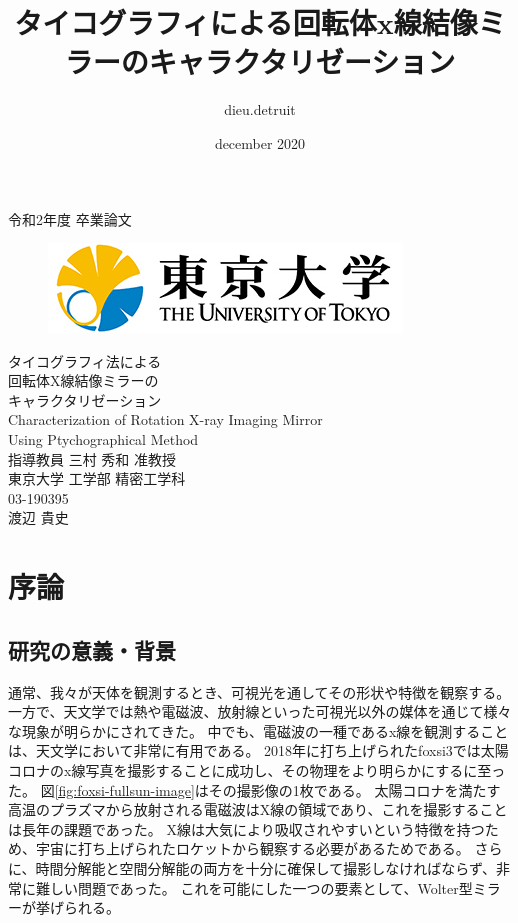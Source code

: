 \documentclass[dvipdfmx,autodetect-engine]{jreport}
\title{タイコグラフィによる回転体x線結像ミラーのキャラクタリゼーション}
\author{dieu.detruit }
\date{december 2020}
\begin{document}
\begin{center}
\thispagestyle{empty}
{\large 令和2年度 卒業論文}\\
\begin{figure}[h]
    \centering
    \includegraphics[scale=0.4]{images/utility/utlogo.jpg}
\end{figure}
\vspace*{2.5cm}
{\huge タイコグラフィ法による}\\
\vspace*{0.5cm}
{\HUGE 回転体X線結像ミラーの}\\
\vspace*{0.5cm}
{\huge キャラクタリゼーション}\\
\vspace*{1.5cm}
{\huge Characterization of Rotation X-ray Imaging Mirror}\\
\vspace*{0.5cm}
{\huge Using Ptychographical Method}\\
\vspace*{3.5cm}
{\large 指導教員 三村 秀和 准教授}\\
\vspace*{1.0cm}
{\large 東京大学 工学部 精密工学科}\\
{\large 03-190395}\\
\vspace*{1.0cm}
{\large 渡辺 貴史}
\end{center}

\newpage
\tableofcontents

\newpage
\chapter{序論}
\minitoc

\newpage
\section{研究の意義・背景}
通常、我々が天体を観測するとき、可視光を通してその形状や特徴を観察する。
一方で、天文学では熱や電磁波、放射線といった可視光以外の媒体を通じて様々な現象が明らかにされてきた。
中でも、電磁波の一種であるx線を観測することは、天文学において非常に有用である。
2018年に打ち上げられたfoxsi3では太陽コロナのx線写真を撮影することに成功し、その物理をより明らかにするに至った。
図\ref{fig:foxsi-fullsun-image}はその撮影像の1枚である。
太陽コロナを満たす高温のプラズマから放射される電磁波はX線の領域であり、これを撮影することは長年の課題であった。
X線は大気により吸収されやすいという特徴を持つため、宇宙に打ち上げられたロケットから観察する必要があるためである。
さらに、時間分解能と空間分解能の両方を十分に確保して撮影しなければならず、非常に難しい問題であった。
これを可能にした一つの要素として、Wolter型ミラーが挙げられる。
\end{document}

